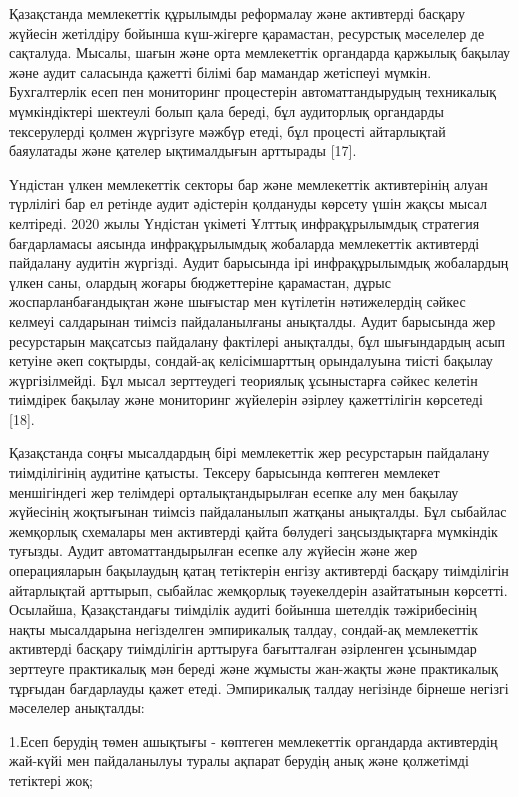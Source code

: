 \begin{multicols}{2}
Қазақстанда мемлекеттік құрылымды реформалау және активтерді басқару
жүйесін жетілдіру бойынша күш-жігерге қарамастан, ресурстық мәселелер де
сақталуда. Мысалы, шағын және орта мемлекеттік органдарда қаржылық
бақылау және аудит саласында қажетті білімі бар мамандар жетіспеуі
мүмкін. Бухгалтерлік есеп пен мониторинг процестерін автоматтандырудың
техникалық мүмкіндіктері шектеулі болып қала береді, бұл аудиторлық
органдарды тексерулерді қолмен жүргізуге мәжбүр етеді, бұл процесті
айтарлықтай баяулатады және қателер ықтималдығын арттырады {[}17{]}.

Үндістан үлкен мемлекеттік секторы бар және мемлекеттік активтерінің
алуан түрлілігі бар ел ретінде аудит әдістерін қолдануды көрсету үшін
жақсы мысал келтіреді. 2020 жылы Үндістан үкіметі Ұлттық инфрақұрылымдық
стратегия бағдарламасы аясында инфрақұрылымдық жобаларда мемлекеттік
активтерді пайдалану аудитін жүргізді. Аудит барысында ірі
инфрақұрылымдық жобалардың үлкен саны, олардың жоғары бюджеттеріне
қарамастан, дұрыс жоспарланбағандықтан және шығыстар мен күтілетін
нәтижелердің сәйкес келмеуі салдарынан тиімсіз пайдаланылғаны анықталды.
Аудит барысында жер ресурстарын мақсатсыз пайдалану фактілері анықталды,
бұл шығындардың асып кетуіне әкеп соқтырды, сондай-ақ келісімшарттың
орындалуына тиісті бақылау жүргізілмейді. Бұл мысал зерттеудегі
теориялық ұсыныстарға сәйкес келетін тиімдірек бақылау және мониторинг
жүйелерін әзірлеу қажеттілігін көрсетеді {[}18{]}.

Қазақстанда соңғы мысалдардың бірі мемлекеттік жер ресурстарын пайдалану
тиімділігінің аудитіне қатысты. Тексеру барысында көптеген мемлекет
меншігіндегі жер телімдері орталықтандырылған есепке алу мен бақылау
жүйесінің жоқтығынан тиімсіз пайдаланылып жатқаны анықталды. Бұл
сыбайлас жемқорлық схемалары мен активтерді қайта бөлудегі
заңсыздықтарға мүмкіндік туғызды. Аудит автоматтандырылған есепке алу
жүйесін және жер операцияларын бақылаудың қатаң тетіктерін енгізу
активтерді басқару тиімділігін айтарлықтай арттырып, сыбайлас жемқорлық
тәуекелдерін азайтатынын көрсетті. Осылайша, Қазақстандағы тиімділік
аудиті бойынша шетелдік тәжірибесінің нақты мысалдарына негізделген
эмпирикалық талдау, сондай-ақ мемлекеттік активтерді басқару тиімділігін
арттыруға бағытталған әзірленген ұсынымдар зерттеуге практикалық мән
береді және жұмысты жан-жақты және практикалық тұрғыдан бағдарлауды
қажет етеді. Эмпирикалық талдау негізінде бірнеше негізгі мәселелер
анықталды:

1.Есеп берудің төмен ашықтығы - көптеген мемлекеттік органдарда
активтердің жай-күйі мен пайдаланылуы туралы ақпарат берудің анық және
қолжетімді тетіктері жоқ;


\end{multicols}
